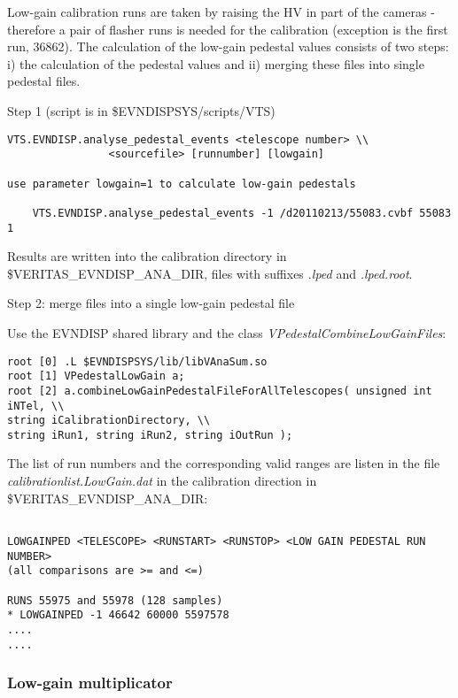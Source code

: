 \documentclass[titlepage,a4paper,twoside,11pt]{report}
\begin{document}
Low-gain calibration runs are taken by raising the HV in part of the cameras - therefore a pair of flasher runs is needed for
the calibration (exception is the first run, 36862).
The calculation of the low-gain pedestal values consists of two steps: 
i) the calculation of the pedestal values and ii) merging these files into single pedestal files.

Step 1 (script is in \$EVNDISPSYS/scripts/VTS)
\begin{lstlisting}
VTS.EVNDISP.analyse_pedestal_events <telescope number> \\
				<sourcefile> [runnumber] [lowgain]

use parameter lowgain=1 to calculate low-gain pedestals

    VTS.EVNDISP.analyse_pedestal_events -1 /d20110213/55083.cvbf 55083 1

\end{lstlisting}

Results are written into the calibration directory in \$VERITAS\_EVNDISP\_ANA\_DIR, 
files with suffixes {\it.lped} and {\it .lped.root}.

Step 2: merge files into a single low-gain pedestal file

Use the EVNDISP shared library and the class {\it VPedestalCombineLowGainFiles}:

\begin{lstlisting}
root [0] .L $EVNDISPSYS/lib/libVAnaSum.so
root [1] VPedestalLowGain a;
root [2] a.combineLowGainPedestalFileForAllTelescopes( unsigned int iNTel, \\
string iCalibrationDirectory, \\
string iRun1, string iRun2, string iOutRun );
\end{lstlisting}

The list of run numbers and the corresponding valid ranges are listen in the file
{\it calibrationlist.LowGain.dat} in the calibration direction in \$VERITAS\_EVNDISP\_ANA\_DIR:

\begin{lstlisting}

LOWGAINPED <TELESCOPE> <RUNSTART> <RUNSTOP> <LOW GAIN PEDESTAL RUN NUMBER>
(all comparisons are >= and <=)

RUNS 55975 and 55978 (128 samples)
* LOWGAINPED -1 46642 60000 5597578 
....
....

\end{lstlisting}

\subsubsection{Low-gain multiplicator}
\end{document}

